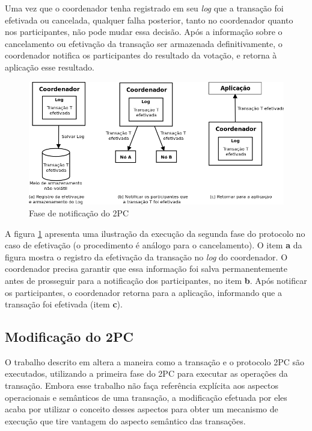 \documentclass[11pt,twoside,a4paper]{book}
\begin{document}
Uma vez que o coordenador tenha registrado em seu \emph{log} que a transação foi efetivada ou cancelada, qualquer falha posterior, tanto no coordenador quanto nos participantes, não pode mudar essa decisão. Após a informação sobre o cancelamento ou efetivação da transação ser armazenada definitivamente, o coordenador notifica os participantes do resultado da votação, e retorna à aplicação esse resultado.

\begin{figure}
  \centering
  \includegraphics[width=\textwidth]{fase_notificacao_2pc} 
  \caption{Fase de notificação do 2PC}
  \label{fig:fase_notificacao_2pc} 
\end{figure}

A figura \ref{fig:fase_notificacao_2pc} apresenta uma ilustração da execução da segunda fase do protocolo no caso de efetivação (o procedimento é análogo para o cancelamento). O item \textbf{a} da figura mostra o registro da efetivação da transação no \emph{log} do coordenador. O coordenador precisa garantir que essa informação foi salva permanentemente antes de prosseguir para a notificação dos participantes, no item \textbf{b}. Após notificar os participantes, o coordenador retorna para a aplicação, informando que a transação foi efetivada (item \textbf{c}). 

\subsection{Modificação do 2PC}
\label{subsec:modificacao_2pc}
O trabalho descrito em \cite{sinfonia} altera a maneira como a transação e o protocolo 2PC são executados, utilizando a primeira fase do 2PC para executar as operações da transação. Embora esse trabalho não faça referência explícita aos aspectos operacionais e semânticos de uma transação, a modificação efetuada por eles acaba por utilizar o conceito desses aspectos para obter um mecanismo de execução que tire vantagem do aspecto semântico das transações.
\end{document}
